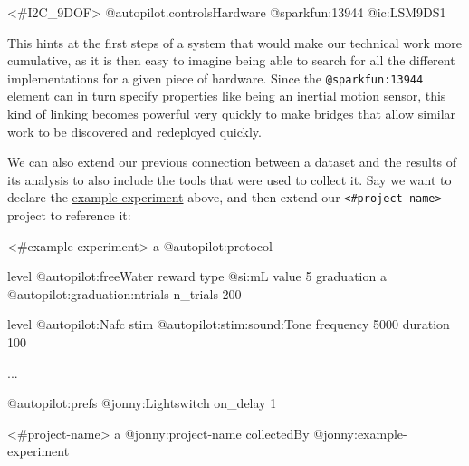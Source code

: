 \documentclass[10pt]{article}
\newenvironment{Shaded}{}{}
\newcommand{\NormalTok}[1]{#1}
\begin{document}
\begin{multicols}{2}
\begin{Shaded}
\begin{Highlighting}[]
\NormalTok{\textless{}\#I2C\_9DOF\textgreater{}}
\NormalTok{  @autopilot.controlsHardware}
\NormalTok{    @sparkfun:13944}
\NormalTok{    @ic:LSM9DS1}
\end{Highlighting}
\end{Shaded}

This hints at the first steps of a system that would make our technical
work more cumulative, as it is then easy to imagine being able to search
for all the different implementations for a given piece of hardware.
Since the \texttt{@sparkfun:13944} element can in turn specify
properties like being an inertial motion sensor, this kind of linking
becomes powerful very quickly to make bridges that allow similar work to
be discovered and redeployed quickly.

We can also extend our previous connection between a dataset and the
results of its analysis to also include the tools that were used to
collect it. Say we want to declare the
\href{https://gist.github.com/sneakers-the-rat/eebe675326a157df49f66f62c4e33a6e}{example
experiment} above, and then extend our
\texttt{\textless{}\#project-name\textgreater{}} project to reference
it:

\begin{Shaded}
\begin{Highlighting}[]
\NormalTok{\textless{}\#example{-}experiment\textgreater{}}
\NormalTok{  a @autopilot:protocol}

\NormalTok{  level @autopilot:freeWater}
\NormalTok{    reward}
\NormalTok{      type @si:mL}
\NormalTok{      value 5}
\NormalTok{    graduation }
\NormalTok{      a @autopilot:graduation:ntrials}
\NormalTok{      n\_trials 200}

\NormalTok{  level @autopilot:Nafc}
\NormalTok{    stim}
\NormalTok{      @autopilot:stim:sound:Tone}
\NormalTok{        frequency 5000}
\NormalTok{        duration 100}

\NormalTok{  ...}

\NormalTok{  @autopilot:prefs}
\NormalTok{    @jonny:Lightswitch}
\NormalTok{      on\_delay 1}

\NormalTok{\textless{}\#project{-}name\textgreater{}}
\NormalTok{  a @jonny:project{-}name}
\NormalTok{  collectedBy @jonny:example{-}experiment}
\end{Highlighting}
\end{Shaded}


\end{multicols}
\end{document}
